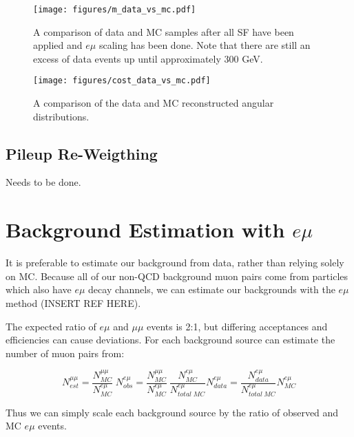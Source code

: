 \documentclass[
    10pt, %
    a4paper, %
    oneside, %
    headinclude,footinclude, %
    BCOR5mm, %
]{scrartcl}
\begin{document}
    \begin{figure}[P]
        \centering
        \texttt{[image: figures/m\_data\_vs\_mc.pdf]}
        \caption{A comparison of data and MC samples after all SF have been applied and 
            $e \mu$ scaling has been done. Note that there are still an excess of data events up until approximately
            300 GeV.
        }
        \label{fig:m_data_vs_mc}
    \end{figure}

    \begin{figure}[P]
        \centering
        \texttt{[image: figures/cost\_data\_vs\_mc.pdf]}
        \caption{A comparison of the data and MC reconstructed angular distributions. }
        \label{fig:cost_data_vs_mc}
    \end{figure}


    \subsection{Pileup Re-Weigthing}
    Needs to be done. \\

    \section{Background Estimation with $e \mu$}
    It is preferable to estimate our background from data, rather than relying solely on MC. 
    Because all of our non-QCD background muon pairs come from particles which also have 
    $e \mu$ decay channels, we can estimate our backgrounds with the $e \mu$ method (INSERT REF HERE). 

    The expected ratio of $e\mu$ and $\mu \mu$ events is 2:1, but differing acceptances and efficiencies can 
    cause deviations. For each background source can estimate the number of muon pairs from:

    \begin{equation}
        N^{\mu \mu}_{est} = \frac{N^{\mu \mu}_{MC}}{N^{e\mu}_{MC}} \; N^{e\mu}_{obs}
                      = \frac{N^{\mu \mu}_{MC}}{N^{e\mu}_{MC}} \: 
                        \frac{N^{e\mu}_{MC}}{N^{e\mu}_{total \; MC}} N^{e \mu}_{data}
        = \frac{N^{e \mu}_{data}}{N^{e\mu}_{total \: MC}} N^{e\mu}_{MC}
        \label{eq:emu}
    \end{equation}

    Thus we can simply scale each background source by the ratio of observed and MC $e \mu$ events. \\
\end{document}

